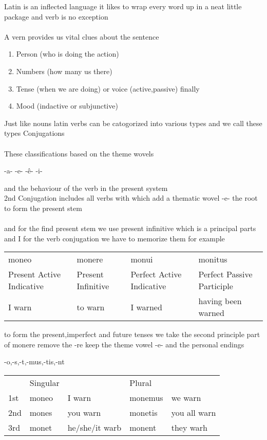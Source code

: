 Latin is an inflected language it likes to wrap every word up in a neat 
little package and verb is no exception \\\\
A vern provides us vital clues about the sentence
\begin{enumerate}[I]
  \item Person (who is doing the action)
  \item Numbers (how many us there)
  \item Tense (when we are doing) or voice (active,passive) finally
  \item Mood (indactive or subjunctive)
\end{enumerate}
Just like nouns latin verbs can be catogorized into various types and we call these
types Conjugations \\\\
These classifications based on the theme wovels 
\begin{center}
  -a- -e- -ê- -i- 
\end{center}
and the behaviour of the verb in the present system\\
2nd Conjugation includes all verbs with which add a 
thematic wovel -e- the root to form the present stem \\\\
and for the find present stem we use present infinitive which is a principal parts
and I for the verb conjugation we have to memorize them for example \vspace{5mm} \\
\begin{tabular}{llll}
  \centering
  moneo & monere & monui & monitus \\ 
  Present Active Indicative & Present Infinitive & Perfect Active Indicative & Perfect Passive Participle \\
  I warn & to warn & I warned & having been warned  \\
\end{tabular}
to form the present,imperfect and future tenses we take the second principle part of monere remove the 
-re keep the theme vowel -e- and the personal endings
\begin{center}
 -o,-s,-t,-mus,-tis,-nt 
\end{center}

\begin{center}  
  \begin{tabular}{lllll}
    \centering
    & Singular & & Plural &  \\
    1st & moneo & I warn & monemus & we warn \\
    2nd & mones & you warn & monetis & you all warn \\ 
    3rd & monet & he/she/it warb & monent & they warh \\
  \end{tabular}
\end{center}


